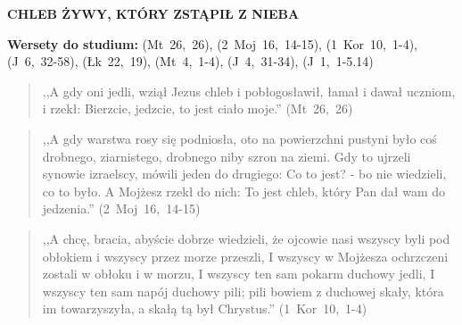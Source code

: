\documentclass[10pt,a4paper,oneside]{article}
\begin{document}
\centerline{\textbf{\MakeUppercase{Chleb żywy, który zstąpił z nieba}}}
\begin{center}
\textbf{Wersety do studium:} \mbox{(Mt 26, 26)}, \mbox{(2 Moj 16, 14-15)}, \mbox{(1 Kor 10, 1-4)}, \mbox{(J 6, 32-58)}, \mbox{(Łk 22, 19)}, \mbox{(Mt 4, 1-4)}, \mbox{(J 4, 31-34)}, \mbox{(J 1, 1-5.14)}
\end{center}
\begin{quote}
,,A gdy oni jedli, wziął Jezus chleb i pobłogosławił, łamał i dawał uczniom, i rzekł: Bierzcie, jedzcie, to jest ciało moje.'' \mbox{(Mt 26, 26)}
\end{quote}
\begin{quote}
,,A gdy warstwa rosy się podniosła, oto na powierzchni pustyni było coś drobnego, ziarnistego, drobnego niby szron na ziemi. Gdy to ujrzeli synowie izraelscy, mówili jeden do drugiego: Co to jest? - bo nie wiedzieli, co to było. A Mojżesz rzekł do nich: To jest chleb, który Pan dał wam do jedzenia.'' \mbox{(2 Moj 16, 14-15)}
\end{quote}
\begin{quote}
,,A chcę, bracia, abyście dobrze wiedzieli, że ojcowie nasi wszyscy byli pod obłokiem i wszyscy przez morze przeszli, I wszyscy w Mojżesza ochrzczeni zostali w obłoku i w morzu, I wszyscy ten sam pokarm duchowy jedli, I wszyscy ten sam napój duchowy pili; pili bowiem z duchowej skały, która im towarzyszyła, a skałą tą był Chrystus.'' \mbox{(1 Kor 10, 1-4)}
\end{quote}
\end{document}

